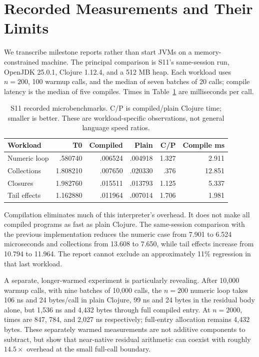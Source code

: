 \documentclass[acmsmall,screen,review,nonacm]{acmart}
\begin{document}
\section{Recorded Measurements and Their Limits}\label{sec:eval}
We transcribe milestone reports rather than start JVMs on a memory-constrained
machine. The principal comparison is S11's same-session run, OpenJDK 25.0.1,
Clojure 1.12.4, and a 512 MB heap. Each workload uses $n=200$, 100 warmup calls,
and the median of seven batches of 20 calls; compile latency is the median of
five compiles. Times in Table~\ref{tab:bench} are milliseconds per call.
\begin{table}[t]
\caption{S11 recorded microbenchmarks. C/P is compiled/plain Clojure time;
smaller is better. These are workload-specific observations, not general
language speed ratios.}\label{tab:bench}
\small
\begin{tabular}{lrrrrr}
\toprule Workload & T0 & Compiled & Plain & C/P & Compile ms\\\midrule
Numeric loop & .580740 & .006524 & .004918 & 1.327 & 2.911\\
Collections & 1.808210 & .007650 & .020330 & .376 & 12.851\\
Closures & 1.982760 & .015511 & .013793 & 1.125 & 5.337\\
Tail effects & 1.162880 & .011964 & .007014 & 1.706 & 1.981\\\bottomrule
\end{tabular}
\end{table}
Compilation eliminates much of this interpreter's overhead. It does not make
all compiled programs as fast as plain Clojure. The same-session comparison
with the previous implementation reduces the numeric case from 7.901 to
6.524 microseconds and collections from 13.608 to 7.650, while tail effects
increase from 10.794 to 11.964. The report cannot exclude an approximately
11\% regression in that last workload.

A separate, longer-warmed experiment is particularly revealing. After 10,000
warmup calls, with nine batches of 10,000 calls, the $n=200$ numeric loop takes
106 ns and 24 bytes/call in plain Clojure, 99 ns and 24 bytes in the residual
body alone, but 1,536 ns and 4,432 bytes through full compiled entry. At
$n=2000$, times are 847, 784, and 2,027 ns respectively; full-entry allocation
remains 4,432 bytes. These separately warmed measurements are not additive
components to subtract, but show that near-native residual arithmetic can
coexist with roughly $14.5\times$ overhead at the small full-call boundary.
\end{document}

